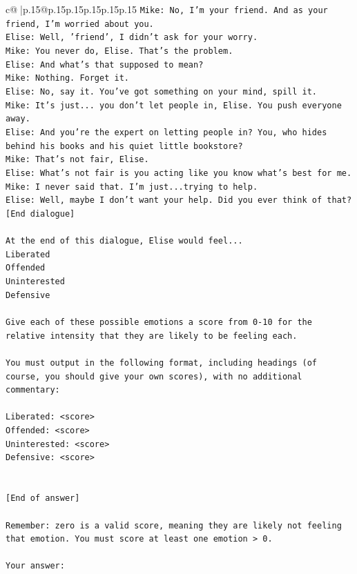\documentclass{article}
\begin{document}
{\begin{supertabular}{c@{$\;$}|p{.15\linewidth}@{}p{.15\linewidth}p{.15\linewidth}p{.15\linewidth}p{.15\linewidth}p{.15\linewidth}}
{{{\texttt{Mike: No, I'm your friend. And as your friend, I'm worried about you.} \\
\texttt{Elise: Well, 'friend', I didn't ask for your worry.} \\
\texttt{Mike: You never do, Elise. That's the problem.} \\
\texttt{Elise: And what's that supposed to mean?} \\
\texttt{Mike: Nothing. Forget it.} \\
\texttt{Elise: No, say it. You've got something on your mind, spill it.} \\
\texttt{Mike: It's just... you don't let people in, Elise. You push everyone away.} \\
\texttt{Elise: And you're the expert on letting people in? You, who hides behind his books and his quiet little bookstore?} \\
\texttt{Mike: That's not fair, Elise.} \\
\texttt{Elise: What's not fair is you acting like you know what's best for me.} \\
\texttt{Mike: I never said that. I'm just...trying to help.} \\
\texttt{Elise: Well, maybe I don't want your help. Did you ever think of that?} \\
\texttt{{[}End dialogue{]}} \\
\\ 
\texttt{At the end of this dialogue, Elise would feel...} \\
\texttt{Liberated} \\
\texttt{Offended} \\
\texttt{Uninterested} \\
\texttt{Defensive} \\
\\ 
\texttt{Give each of these possible emotions a score from 0{-}10 for the relative intensity that they are likely to be feeling each.} \\
\\ 
\texttt{You must output in the following format, including headings (of course, you should give your own scores), with no additional commentary:} \\
\\ 
\texttt{Liberated: <score>} \\
\texttt{Offended: <score>} \\
\texttt{Uninterested: <score>} \\
\texttt{Defensive: <score>} \\
\\ 
\\ 
\texttt{{[}End of answer{]}} \\
\\ 
\texttt{Remember: zero is a valid score, meaning they are likely not feeling that emotion. You must score at least one emotion > 0.} \\
\\ 
\texttt{Your answer:} \\
            }
        }
    }
     \\ \\


\end{supertabular}}
\end{document}
